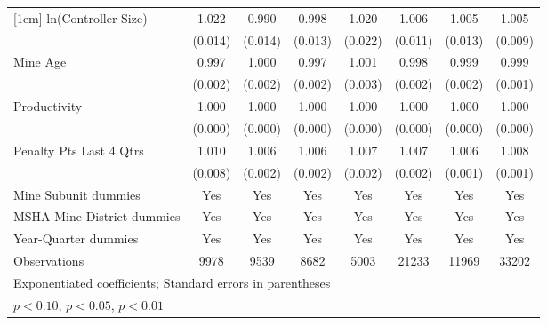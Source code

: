 {\begin{tabular}{l*{7}{c}}
[1em]
ln(Controller Size)      &       1.022         &       0.990         &       0.998         &       1.020         &       1.006         &       1.005         &       1.005         \\
                         &     (0.014)         &     (0.014)         &     (0.013)         &     (0.022)         &     (0.011)         &     (0.013)         &     (0.009)         \\
[1em]
Mine Age                 &       0.997         &       1.000         &       0.997         &       1.001         &       0.998         &       0.999         &       0.999         \\
                         &     (0.002)         &     (0.002)         &     (0.002)         &     (0.003)         &     (0.002)         &     (0.002)         &     (0.001)         \\
[1em]
Productivity             &       1.000\sym{**} &       1.000\sym{**} &       1.000\sym{*}  &       1.000         &       1.000\sym{***}&       1.000         &       1.000         \\
                         &     (0.000)         &     (0.000)         &     (0.000)         &     (0.000)         &     (0.000)         &     (0.000)         &     (0.000)         \\
[1em]
Penalty Pts Last 4 Qtrs  &       1.010         &       1.006\sym{***}&       1.006\sym{***}&       1.007\sym{***}&       1.007\sym{***}&       1.006\sym{***}&       1.008\sym{***}\\
                         &     (0.008)         &     (0.002)         &     (0.002)         &     (0.002)         &     (0.002)         &     (0.001)         &     (0.001)         \\
[1em]
Mine Subunit dummies     &         Yes         &         Yes         &         Yes         &         Yes         &         Yes         &         Yes         &         Yes         \\
[1em]
MSHA Mine District dummies&         Yes         &         Yes         &         Yes         &         Yes         &         Yes         &         Yes         &         Yes         \\
[1em]
Year-Quarter dummies     &         Yes         &         Yes         &         Yes         &         Yes         &         Yes         &         Yes         &         Yes         \\
\hline
Observations             &        9978         &        9539         &        8682         &        5003         &       21233         &       11969         &       33202         \\
\hline\hline
\multicolumn{8}{l}{\footnotesize Exponentiated coefficients; Standard errors in parentheses}\\
\multicolumn{8}{l}{\footnotesize \sym{*} \(p<0.10\), \sym{**} \(p<0.05\), \sym{***} \(p<0.01\)}\\
\end{tabular}
}
